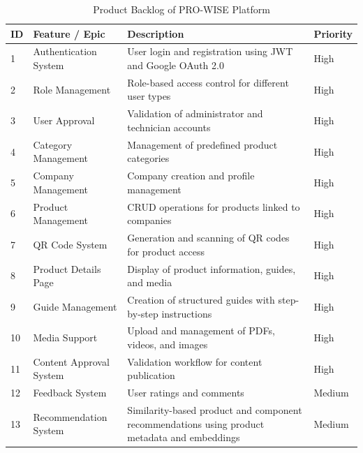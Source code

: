 \documentclass[12pt,a4paper]{report}
\begin{document}
\begin{table}[H]
\centering
\small
\caption{Product Backlog of PRO-WISE Platform}
\label{tab:product_backlog}
\begin{tabular}{p{0.7cm}p{3.1cm}p{8.1cm}p{1.4cm}}
\toprule
\textbf{ID} & \textbf{Feature / Epic} & \textbf{Description} & \textbf{Priority} \\
\midrule
1 & Authentication System & User login and registration using JWT and Google OAuth 2.0 & High \\
2 & Role Management & Role-based access control for different user types & High \\
3 & User Approval & Validation of administrator and technician accounts & High \\
4 & Category Management & Management of predefined product categories & High \\
5 & Company Management & Company creation and profile management & High \\
6 & Product Management & CRUD operations for products linked to companies & High \\
7 & QR Code System & Generation and scanning of QR codes for product access & High \\
8 & Product Details Page & Display of product information, guides, and media & High \\
9 & Guide Management & Creation of structured guides with step-by-step instructions & High \\
10 & Media Support & Upload and management of PDFs, videos, and images & High \\
11 & Content Approval System & Validation workflow for content publication & High \\
12 & Feedback System & User ratings and comments & Medium \\
13 & Recommendation System & Similarity-based product and component recommendations using product metadata and embeddings & Medium \\
\bottomrule
\end{tabular}
\end{table}
\end{document}
